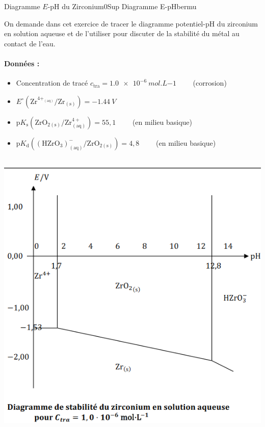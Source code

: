 
\begin{exercise}{Diagramme $E$-pH du Zirconium}{0}{Sup}
{Diagramme E-pH}{bermu}

On demande dans cet exercice de tracer le diagramme potentiel-pH du zirconium en solution aqueuse
et de l’utiliser pour discuter de la stabilité du métal au contact de l’eau.




\paragraph{Données :}
\begin{itemize}
    \item Concentration de tracé $c_\text{tra} = \SI{1.0e-6}{mol.L{-1}}\qquad$ (corrosion)

    \item $E^\circ(\mathrm{Zr^{4+_{(aq)}}/Zr_{(s)}}) = \SI{-1,44}{V}$

    \item $\text{p}K_\text{s}(\mathrm{ZrO_{2(s)}/Zr^{4+}_{(aq)}}) = 55,1\qquad$ (en milieu basique)

    \item $\text{p}K_\text{d}(\mathrm{(HZrO_3)^-_{(aq)}/ZrO_{2(s)}}) = 4,8\qquad$ (en milieu basique)

\end{itemize}

\end{exercise}

\begin{solution}

~\includegraphics[]{chimie/E-pH/zirco.png}

\end{solution}
